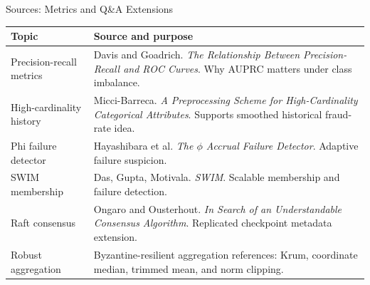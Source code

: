 \documentclass[aspectratio=169,10pt]{beamer}
\begin{document}
\begin{frame}{Sources: Metrics and Q\&A Extensions}
  \small
  \begin{tabular}{p{}p{}}
    \toprule
    Topic & Source and purpose \\
    \midrule
    Precision-recall metrics &
    Davis and Goadrich. \textit{The Relationship Between Precision-Recall and ROC Curves}. Why AUPRC matters under class imbalance. \\
    High-cardinality history &
    Micci-Barreca. \textit{A Preprocessing Scheme for High-Cardinality Categorical Attributes}. Supports smoothed historical fraud-rate idea. \\
    Phi failure detector &
    Hayashibara et al. \textit{The \(\phi\) Accrual Failure Detector}. Adaptive failure suspicion. \\
    SWIM membership &
    Das, Gupta, Motivala. \textit{SWIM}. Scalable membership and failure detection. \\
    Raft consensus &
    Ongaro and Ousterhout. \textit{In Search of an Understandable Consensus Algorithm}. Replicated checkpoint metadata extension. \\
    Robust aggregation &
    Byzantine-resilient aggregation references: Krum, coordinate median, trimmed mean, and norm clipping. \\
    \bottomrule
  \end{tabular}
\end{frame}
\end{document}
